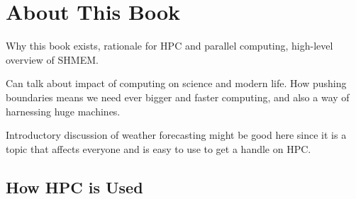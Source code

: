 %
% 
% 
% 
% 
% 
% 
%

\chapter{About This Book}

Why this book exists, rationale for HPC and parallel computing,
high-level overview of SHMEM.

Can talk about impact of computing on science and modern life.  How
pushing boundaries means we need ever bigger and faster computing, and
also a way of harnessing huge machines.

Introductory discussion of weather forecasting might be good here
since it is a topic that affects everyone and is easy to use to get a
handle on HPC.

\section{How HPC is Used}


